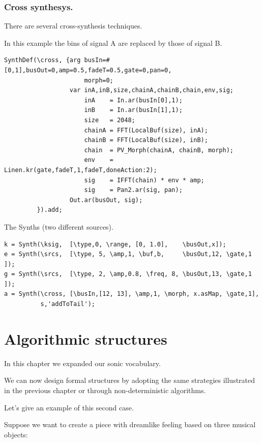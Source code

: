 \subsubsection{Cross synthesys.}\label{cross-synthesys.}

There are several cross-synthesis techniques.

In this example the bins of signal A are replaced by those of signal B.

\begin{lstlisting}[frame=single,caption=Morphing spectral model] 
SynthDef(\cross, {arg busIn=#[0,1],busOut=0,amp=0.5,fadeT=0.5,gate=0,pan=0,
                      morph=0;
                  var inA,inB,size,chainA,chainB,chain,env,sig;
                      inA    = In.ar(busIn[0],1);
                      inB    = In.ar(busIn[1],1);
                      size   = 2048;
                      chainA = FFT(LocalBuf(size), inA);
                      chainB = FFT(LocalBuf(size), inB);
                      chain  = PV_Morph(chainA, chainB, morph);
                      env    = Linen.kr(gate,fadeT,1,fadeT,doneAction:2);
                      sig    = IFFT(chain) * env * amp;
                      sig    = Pan2.ar(sig, pan);
                  Out.ar(busOut, sig);
         }).add;
\end{lstlisting}

The Synths (two different sources).

\begin{lstlisting}[frame=single] 
k = Synth(\ksig,  [\type,0, \range, [0, 1.0],    \busOut,x]);
e = Synth(\srcs,  [\type, 5, \amp,1, \buf,b,     \busOut,12, \gate,1 ]);
g = Synth(\srcs,  [\type, 2, \amp,0.8, \freq, 8, \busOut,13, \gate,1 ]);
a = Synth(\cross, [\busIn,[12, 13], \amp,1, \morph, x.asMap, \gate,1],
          s,'addToTail');
\end{lstlisting}

\section{Algorithmic structures}\label{algorithmic-structures}

In this chapter we expanded our sonic vocabulary.

We can now design formal structures by adopting the same strategies illustrated in the previous chapter or through non-deterministic algorithms.

Let's give an example of this second case.

Suppose we want to create a piece with dreamlike feeling based on three musical objects:

